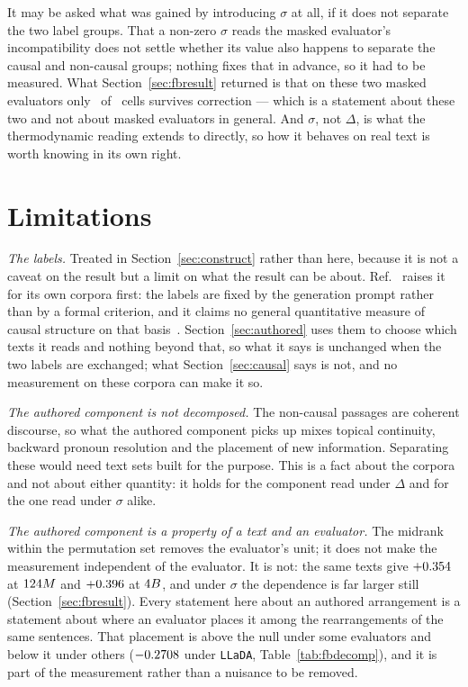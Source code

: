 \documentclass[11pt]{article}
\begin{document}
It may be asked what was gained by introducing $\sigma$ at all, if it does
not separate the two label groups.  That a non-zero $\sigma$
reads the masked evaluator's incompatibility does not settle whether its
value also happens to separate the causal and non-causal groups; nothing
fixes that in advance, so it had to be measured.  What Section~\ref{sec:fbresult}
returned is that on these two masked evaluators only \FbNSurviving\ of
\FbNTestsCausal\ cells survives correction --- which is a statement about
these two and not about masked evaluators in general.  And $\sigma$, not
$\Delta$, is what the thermodynamic reading extends to directly, so how it
behaves on real text is worth knowing in its own right.

\section{Limitations}
\label{sec:limitations}

\emph{The labels.}  Treated in Section~\ref{sec:construct} rather than here,
because it is not a caveat on the result but a limit on what the result can be
about.  Ref.~\cite{sagawa2026} raises it for its own corpora first: the
labels are fixed by the generation prompt rather than by a formal criterion,
and it claims no general quantitative measure of causal structure on that
basis~\cite[Sec.~V~B]{sagawa2026}.  Section~\ref{sec:authored} uses them to choose which texts it
reads and nothing beyond that, so what it says is unchanged when the two
labels are exchanged; what Section~\ref{sec:causal} says is not, and no
measurement on these corpora
can make it so.

\emph{The authored component is not decomposed.}  The non-causal passages are
coherent discourse, so what the authored component picks up mixes topical
continuity, backward pronoun resolution and the placement of new
information.  Separating these would need text sets built for the purpose.
This is a fact about the corpora and not about either quantity: it holds for
the component read under $\Delta$ and for the one read under $\sigma$
alike.

\emph{The authored component is a property of a text \emph{and} an evaluator.}
The midrank within the permutation set removes the evaluator's unit; it does
not make the measurement independent of the evaluator.  It is not: the same
texts give $+0.354$ at $124M$ and $+0.396$ at
$4B$, and under $\sigma$ the dependence is far larger still
(Section~\ref{sec:fbresult}).  Every statement here about an authored arrangement is a
statement about where an evaluator places it among the rearrangements of
the same sentences.  That placement is above the null under some
evaluators and below it under others ($-0.2708$ under
\texttt{LLaDA}, Table~\ref{tab:fbdecomp}), and it is part of the
measurement rather than a nuisance to be removed.
\end{document}
